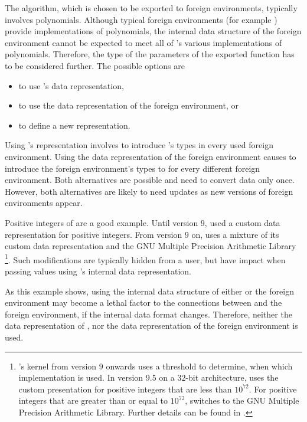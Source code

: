 The algorithm, which is chosen to be exported to foreign environments, typically involves polynomials. Although typical foreign environments (for example \Maple) provide implementations of polynomials, the internal data structure of the foreign environment cannot be expected to meet all of \Aldor's various implementations of polynomials. Therefore, the type of the parameters of the exported function has to be considered further. The possible options are

\begin{itemize}
\item to use \Aldor's data representation,
\item to use the data representation of the foreign environment, or
\item to define a new representation.
\end{itemize}

Using \Aldor's representation involves to introduce \Aldor's types in every used foreign environment. Using the data representation of the foreign environment causes to introduce the foreign environment's types to \Aldor for every different foreign environment. Both alternatives are possible and need to convert data only once. However, both alternatives are likely to need updates as new versions of foreign environments appear. 

Positive integers of \Maple are a good example. Until version $9$, \Maple used a custom data representation for positive integers. From version $9$ on, \Maple uses a mixture of its custom data representation and the GNU Multiple Precision Arithmetic Library \cite{GMP}{}\footnote{\Maple's kernel from version $9$ onwards uses a threshold to determine, when which implementation is used. In version $9.5$  on a $32$-bit architecture, \Maple uses the custom presentation for positive integers that are less than $10^{72}$. For positive integers that are greater than or equal to $10^{72}$, \Maple switches to the GNU Multiple Precision Arithmetic Library. Further details can be found in \cite{Maple9AdvancedProgramming}.}. Such modifications are typically hidden from a \Maple user, but have impact when passing values using \Maple's internal data representation.

As this example shows, using the internal data structure of either \Aldor or the foreign environment may become a lethal factor to the connections between \Aldor and the foreign environment, if the internal data format changes. Therefore, neither the data representation of \Aldor, nor the data representation of the foreign environment is used.

